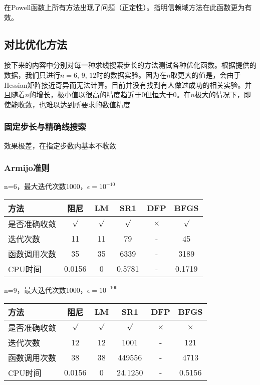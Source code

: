 \documentclass[11pt, a4paper]{article}
\begin{document}
在Powell函数上所有方法出现了问题（正定性）。\cite{Byrd1988}指明信赖域方法在此函数更为有效。

\subsection{对比优化方法}

接下来的内容中分别对每一种求线搜索步长的方法测试各种优化函数。根据\cite{More:1981:TUO:355934.355936}提供的数据，我们只进行$n=6,\,9,\,12$时的数据实验。因为在$n$取更大的值是，会由于Hessian矩阵接近奇异而无法计算。目前并没有找到有人做过成功的相关实验。并且随着$n$的增长，极小值以很高的精度趋近于0但恒大于0。在$n$极大的情况下，即使能收敛，也难以达到所要求的数值精度

\subsubsection{固定步长与精确线搜索}

效果极差，在指定步数内基本不收敛

\subsubsection{Armijo准则}

n=6，最大迭代次数1000，$\epsilon=10^{-10}$

\vspace{10pt}
\begin{tabular}{|l|c|c|c|c|c|}
	\hline
	方法 & 阻尼 & LM & SR1 & DFP & BFGS \\\hline
	是否准确收敛 & $\surd$ & $\surd$ & $\surd$ & $\times$ & $\surd$ \\\hline
	迭代次数 & 11 & 11 & 79 & - & 45 \\\hline
	函数调用次数 & 35 & 35 & 6339 & - & 3189 \\\hline
	CPU时间 & 0.0156 & 0 & 0.5781 & - & 0.1719\\\hline
\end{tabular}

\vspace{20pt}
n=9，最大迭代次数1000，$\epsilon=10^{-100}$

\vspace{10pt}
\begin{tabular}{|l|c|c|c|c|c|}
	\hline
	方法 & 阻尼 & LM & SR1 & DFP & BFGS \\\hline
	是否准确收敛 & $\surd$ & $\surd$ & $\surd$ & $\times$ & $\times$ \\\hline
	迭代次数 & 12 & 12 & 1001 & - & 121 \\\hline
	函数调用次数 & 38 & 38 & 449556 & - & 4713 \\\hline
	CPU时间 & 0.0156 & 0 & 24.1250 & - & 0.5156\\\hline
\end{tabular}
\end{document}

